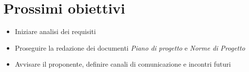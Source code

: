 \section{Prossimi obiettivi}
   \begin{itemize}
        \item Iniziare analisi dei requisiti
        \item Proseguire la redazione dei documenti \textit{Piano di progetto} e \textit{Norme di Progetto}
        \item Avvisare il proponente, definire canali di comunicazione e incontri futuri
    \end{itemize}
